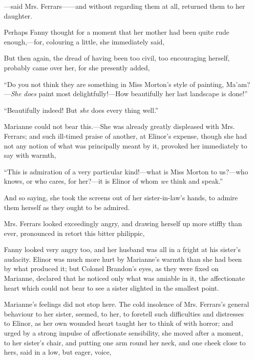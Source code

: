 ---said Mrs. Ferrars------and without regarding them at all, returned them to her daughter.

Perhaps Fanny thought for a moment that her mother had been quite rude enough,---for, colouring a little, she immediately said,

 But then again, the dread of having been too civil, too encouraging herself, probably came over her, for she presently added,

“Do you not think they are something in Miss Morton's style of painting, Ma'am?---{\em She does} paint most delightfully!---How beautifully her last landscape is done!”

“Beautifully indeed! But {\em she} does every thing well.”

Marianne could not bear this.---She was already greatly displeased with Mrs. Ferrars; and such ill-timed praise of another, at Elinor's expense, though she had not any notion of what was principally meant by it, provoked her immediately to say with warmth,

“This is admiration of a very particular kind!---what is Miss Morton to us?---who knows, or who cares, for her?---it is Elinor of whom {\em we} think and speak.”

And so saying, she took the screens out of her sister-in-law's hands, to admire them herself as they ought to be admired.

Mrs. Ferrars looked exceedingly angry, and drawing herself up more stiffly than ever, pronounced in retort this bitter philippic, 

Fanny looked very angry too, and her husband was all in a fright at his sister's audacity. Elinor was much more hurt by Marianne's warmth than she had been by what produced it; but Colonel Brandon's eyes, as they were fixed on Marianne, declared that he noticed only what was amiable in it, the affectionate heart which could not bear to see a sister slighted in the smallest point.

Marianne's feelings did not stop here. The cold insolence of Mrs. Ferrars's general behaviour to her sister, seemed, to her, to foretell such difficulties and distresses to Elinor, as her own wounded heart taught her to think of with horror; and urged by a strong impulse of affectionate sensibility, she moved after a moment, to her sister's chair, and putting one arm round her neck, and one cheek close to hers, said in a low, but eager, voice,

